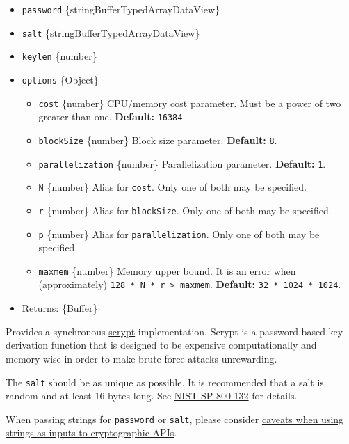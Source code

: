 \begin{itemize}
\tightlist
\item
  \texttt{password}
  \{string\textbar Buffer\textbar TypedArray\textbar DataView\}
\item
  \texttt{salt}
  \{string\textbar Buffer\textbar TypedArray\textbar DataView\}
\item
  \texttt{keylen} \{number\}
\item
  \texttt{options} \{Object\}

  \begin{itemize}
  \tightlist
  \item
    \texttt{cost} \{number\} CPU/memory cost parameter. Must be a power
    of two greater than one. \textbf{Default:} \texttt{16384}.
  \item
    \texttt{blockSize} \{number\} Block size parameter.
    \textbf{Default:} \texttt{8}.
  \item
    \texttt{parallelization} \{number\} Parallelization parameter.
    \textbf{Default:} \texttt{1}.
  \item
    \texttt{N} \{number\} Alias for \texttt{cost}. Only one of both may
    be specified.
  \item
    \texttt{r} \{number\} Alias for \texttt{blockSize}. Only one of both
    may be specified.
  \item
    \texttt{p} \{number\} Alias for \texttt{parallelization}. Only one
    of both may be specified.
  \item
    \texttt{maxmem} \{number\} Memory upper bound. It is an error when
    (approximately) \texttt{128\ *\ N\ *\ r\ \textgreater{}\ maxmem}.
    \textbf{Default:} \texttt{32\ *\ 1024\ *\ 1024}.
  \end{itemize}
\item
  Returns: \{Buffer\}
\end{itemize}

Provides a synchronous
\href{https://en.wikipedia.org/wiki/Scrypt}{scrypt} implementation.
Scrypt is a password-based key derivation function that is designed to
be expensive computationally and memory-wise in order to make
brute-force attacks unrewarding.

The \texttt{salt} should be as unique as possible. It is recommended
that a salt is random and at least 16 bytes long. See
\href{https://nvlpubs.nist.gov/nistpubs/Legacy/SP/nistspecialpublication800-132.pdf}{NIST
SP 800-132} for details.

When passing strings for \texttt{password} or \texttt{salt}, please
consider
\hyperref[using-strings-as-inputs-to-cryptographic-apis]{caveats when
using strings as inputs to cryptographic APIs}.

